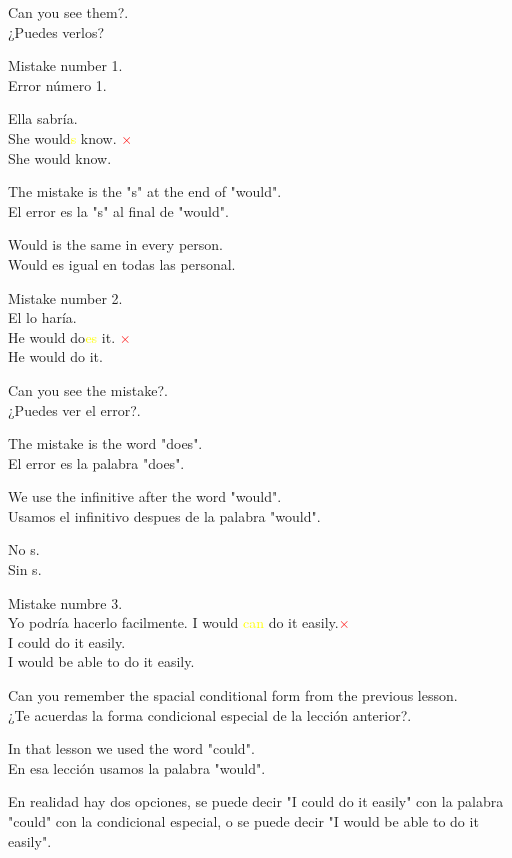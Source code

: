 Can you see them?.\\
¿Puedes verlos?

Mistake number 1.\\
Error número 1.

Ella sabría.\\
She would\textcolor{yellow}{s} know. \textcolor{red}{$\times$}\\
She would know. \textcolor{green}{\checkmark}

The mistake is the "s" at the end of "would".\\
El error es la "s" al final de "would".

Would is the same in every person.\\
Would es igual en todas las personal.

Mistake number 2.\\
El lo haría.\\
He would do\textcolor{yellow}{es} it. \textcolor{red}{$\times$}\\
He would do it. \textcolor{green}{\checkmark}

Can you see the mistake?.\\
¿Puedes ver el error?.

The mistake is the word "does".\\
El error es la palabra "does".

We use the infinitive after the word "would".\\
Usamos el infinitivo despues de la palabra "would".

No s.\\
Sin s.

Mistake numbre 3.\\
Yo podría hacerlo facilmente.
I would \textcolor{yellow}{can} do it easily.\textcolor{red}{$\times$}\\
I could do it easily.\textcolor{green}{\checkmark}\\
I would be able to do it easily.

Can you remember the spacial conditional form from the previous lesson.\\
¿Te acuerdas la forma condicional especial de la lección anterior?.

In that lesson we used the word "could".\\
En esa lección usamos la palabra "would".

En realidad hay dos opciones, se puede decir "I could do it easily" con
la palabra "could" con la condicional especial, o se puede decir "I would
be able to do it easily".\\

